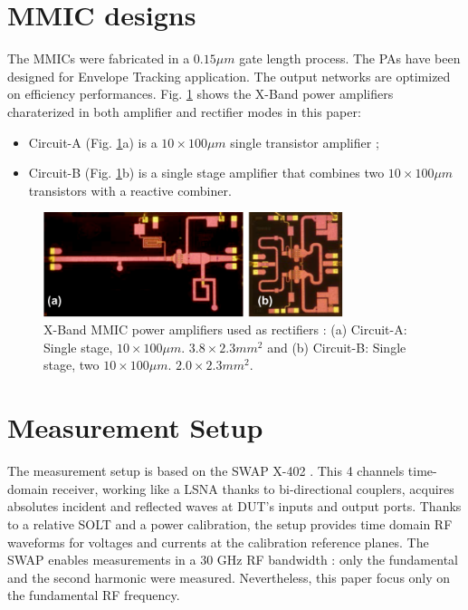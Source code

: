 \documentclass[conference]{IEEEtran}
\begin{document}

\section{MMIC designs}

The MMICs were fabricated in a $0.15\mu m$ gate length process. The PAs have been designed for Envelope Tracking application. The output networks are optimized on efficiency performances.
Fig. \ref{picture} shows the X-Band power amplifiers charaterized in both amplifier and rectifier modes in this paper:
\begin{itemize}
\item Circuit-A (Fig. \ref{picture}a) is a $10\times100\mu m$ single transistor amplifier ;
\item Circuit-B (Fig. \ref{picture}b) is a single stage amplifier that combines two $10\times100\mu m$ transistors with a reactive combiner.
\end{itemize}

\begin{figure}[ht!] %
\centering
\includegraphics[width=3.45in]{IMS2014_Pictures_PA.png}
\caption{ X-Band MMIC power amplifiers used as rectifiers : (a) Circuit-A: Single stage, $10\times100\mu m$. $3.8\times2.3mm^2$ and (b) Circuit-B: Single stage, two $10\times100\mu m$. $2.0\times2.3mm^2$.}
\label{picture}
\end{figure}



\section{Measurement Setup}
The measurement setup is based on the SWAP X-402 \cite{Verspecht2010,Roblin2011}. This 4 channels time-domain receiver, working like a LSNA \cite{Verspecht2005} thanks to bi-directional couplers, acquires absolutes incident and reflected waves at DUT's inputs and output ports. Thanks to a relative SOLT and a power calibration, the setup provides time domain RF waveforms for voltages and currents at the calibration reference planes. The SWAP enables measurements in a $30$ GHz RF bandwidth : only the fundamental and the second harmonic were measured. Nevertheless, this paper focus only on the fundamental RF frequency.
\end{document}
